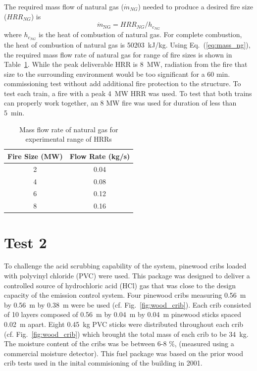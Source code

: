 \documentclass[12pt,oneside]{book}
\begin{document}
The required mass flow of natural gas ($\dot{m}_{NG}$) needed to produce a desired fire size ($HRR_{NG}$) is
\begin{equation}\label{eq:mass_ng}
\dot{m}_{\mathrm{NG}} = HRR_{NG}/h_{c_{NG}}
\end{equation}
where $h_{c_{NG}}$ is the heat of combustion of natural gas. For complete combustion, the heat of combustion of natural gas is 50203~kJ/kg. Using Eq.~(\ref{eq:mass_ng}), the required mass flow rate of natural gas for range of fire sizes is shown in Table~\ref{tab:ng_flow}. While the peak deliverable HRR is 8~MW, radiation from the fire that size to the surrounding environment would be too significant for a 60 min. commissioning test without add additional fire protection to the structure. To test each train, a fire with a peak 4~MW HRR was used. To test that both trains can properly work together, an 8 MW fire was used for duration of less than 5~min. 

\begin{table}
\centering
\caption{Mass flow rate of natural gas for experimental range of HRRs}
\label{tab:ng_flow}
\begin{tabular}{cc}
\toprule[1.5pt]
Fire Size (MW) & Flow Rate (kg/s)  \\
\midrule
2  &  0.04 \\
4  &  0.08 \\
6  &  0.12 \\
8  &  0.16 \\
\bottomrule[1.25pt]
\end{tabular}\par
\end{table}

\section{Test 2}
\label{test2}
To challenge the acid scrubbing capability of the system, pinewood cribs loaded with polyvinyl chloride (PVC) were used. This package was designed to deliver a controlled source of hydrochloric acid (HCl) gas that was close to the design capacity of the emission control system. Four pinewood cribs measuring 0.56~m by 0.56~m by 0.38~m were be used (cf. Fig.~\ref{fig:wood_crib}). Each crib consisted of 10 layers composed of 0.56~m by 0.04~m by 0.04~m pinewood sticks spaced 0.02~m apart. Eight 0.45~kg PVC sticks were distributed throughout each crib (cf. Fig.~\ref{fig:wood_crib}) which brought the total mass of each crib to be 34~kg. The moisture content of the cribs was be between 6-8 \%, (measured using a commercial moisture detector). This fuel package was based on the prior wood crib tests used in the inital commisioning of the building in 2001.
\end{document}
